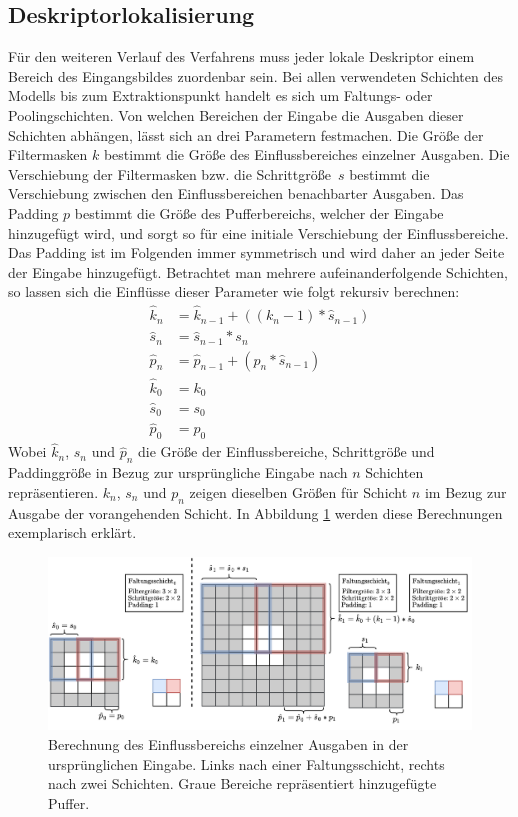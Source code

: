 \subsection{Deskriptorlokalisierung}\label{rf_chapter}
Für den weiteren Verlauf des Verfahrens muss jeder lokale Deskriptor einem Bereich des Eingangsbildes zuordenbar sein. Bei allen verwendeten Schichten des Modells bis zum Extraktionspunkt handelt es sich um Faltungs- oder Poolingschichten. Von welchen Bereichen der Eingabe die Ausgaben dieser Schichten abhängen, lässt sich an drei Parametern festmachen. Die Größe der Filtermasken $k$ bestimmt die Größe des Einflussbereiches einzelner Ausgaben. Die Verschiebung der Filtermasken bzw. die Schrittgröße~$s$ bestimmt die Verschiebung zwischen den Einflussbereichen benachbarter Ausgaben. Das Padding $p$ bestimmt die Größe des Pufferbereichs, welcher der Eingabe hinzugefügt wird, und sorgt so für eine initiale Verschiebung der Einflussbereiche. Das Padding ist im Folgenden immer symmetrisch und wird daher an jeder Seite der Eingabe hinzugefügt. Betrachtet man mehrere aufeinanderfolgende Schichten, so lassen sich die Einflüsse dieser Parameter wie folgt rekursiv berechnen:
\begin{align}
\hat{k}_n &= \hat{k}_{n-1} + ((k_n - 1) * \hat{s}_{n-1})
\\
\hat{s}_n &= \hat{s}_{n-1} * s_n
\\
\hat{p}_n &= \hat{p}_{n-1} + (p_n * \hat{s}_{n-1})
\\
\hat{k}_0 &= k_0
\\
\hat{s}_0 &= s_0
\\
\hat{p}_0 &= p_0
\end{align}
Wobei $\hat{k}_n$, $\hat{s}_n$ und $\hat{p}_n$ die Größe der Einflussbereiche, Schrittgröße und Paddinggröße in Bezug zur ursprüngliche Eingabe nach $n$ Schichten repräsentieren. $k_n$, $s_n$ und $p_n$ zeigen dieselben Größen für Schicht $n$ im Bezug zur Ausgabe der vorangehenden Schicht. In Abbildung \ref{receptive_field} werden diese Berechnungen exemplarisch erklärt.
\begin{figure}[h]
\centering
\includegraphics[scale=0.51]{rf.pdf}
\caption{Berechnung des Einflussbereichs einzelner Ausgaben in der ursprünglichen Eingabe. Links nach einer Faltungsschicht, rechts nach zwei Schichten. Graue Bereiche repräsentiert hinzugefügte Puffer.}
\label{receptive_field}
\end{figure}
